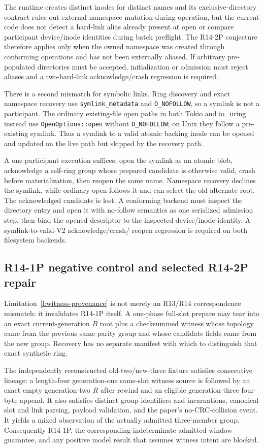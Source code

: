 \documentclass[10pt,twocolumn]{article}
\theoremstyle{remark}
\newcommand{\code}[1]{\texttt{#1}}
\begin{document}
The runtime creates distinct inodes for distinct names and its exclusive-directory contract rules
out external namespace mutation during operation, but the current code does not detect a
hard-link alias already present at open or compare participant device/inode identities during batch
preflight. The R14-2P conjecture therefore applies only when the owned namespace was created through
conforming operations and has not been externally aliased. If arbitrary pre-populated directories
must be accepted, initialization or admission must reject aliases and a two-hard-link
acknowledge/crash regression is required.

There is a second mismatch for symbolic links. Ring discovery and exact namespace recovery use
\code{symlink\_metadata} and \code{O\_NOFOLLOW}, so a symlink is not a participant. The ordinary
existing-file open paths in both Tokio and io\_uring instead use \code{OpenOptions::open} without
\code{O\_NOFOLLOW}; on Unix they follow a pre-existing symlink. Thus a symlink to a valid atomic
backing inode can be opened and updated on the live path but skipped by the recovery path.

A one-participant execution suffices: open the symlink as an atomic blob, acknowledge a self-ring
group whose prepared candidate is otherwise valid, crash before materialization, then reopen the
same name. Namespace recovery declines the symlink, while ordinary open follows it and can select
the old alternate root. The acknowledged candidate is lost. A conforming backend must inspect the
directory entry and open it with no-follow semantics as one serialized admission step, then bind the
opened descriptor to the inspected device/inode identity. A symlink-to-valid-V2 acknowledge/crash/
reopen regression is required on both filesystem backends.

\subsection{R14-1P negative control and selected R14-2P repair}

Limitation~\ref{l:witness-provenance} is not merely an R13/R14 correspondence mismatch: it
invalidates R14-1P itself. A one-phase full-slot prepare may tear into an exact current-generation
$B$ root plus a checksummed witness whose topology came from the previous same-parity group and
whose candidate fields came from the new group. Recovery has no separate manifest with which to
distinguish that exact synthetic ring.

The independently reconstructed old-two/new-three fixture satisfies consecutive lineage: a
length-four generation-one same-slot witness source is followed by an exact empty generation-two
$R$ after rewind and an eligible generation-three four-byte append. It also satisfies distinct
group identifiers and incarnations, canonical slot and link parsing, payload validation, and the
paper's no-CRC-collision event. It yields a mixed observation of the actually admitted three-member
group. Consequently R14-1P, the corresponding indeterminate admitted-window guarantee, and any
positive model result that assumes witness intent are blocked.
\end{document}
